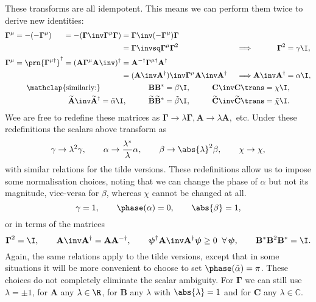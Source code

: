 \documentclass[11pt]{article}
\newcommand{\invd}{^{-\dag}}
\newcommand{\Gammab}{\boldsymbol{\Gamma}}
\newcommand{\Gammap}[1][\mu]{\prn{\Gammab^{#1}}}
\newcommand{\mud}{{\mu\dag}}
\newcommand{\A}{\mathbf{A}}
\newcommand{\B}{\mathbf{B}}
\renewcommand{\C}{\mathbf{C}}
\newcommand{\At}{\widetilde{\mathbf{A}}}
\newcommand{\Bt}{\widetilde{\mathbf{B}}}
\newcommand{\Ct}{\widetilde{\mathbf{C}}}
\newcommand{\Cb}{\mathbb{C}}
\newcommand{\psib}{\boldsymbol{\psi}}
\newcommand{\alphat}{\tilde{\alpha}}
\newcommand{\betat}{\tilde{\beta}}
\newcommand{\chit}{\tilde{\chi}}
\begin{document}
These transforms are all idempotent.
This means we can perform them twice to derive new identities:
%
\begin{equation*}
\begin{gathered}
\begin{alignedat}{5}
  \Gammab^\mu &= -(-\Gammab^\mu) &
        &= -(\Gammab\inv \Gammab^\mu \Gammab) &
        &= \Gammab\inv (-\Gammab^\mu) \Gammab \\ && &&
        &= \Gammab\invsq \Gammab^\mu \Gammab^2 &\quad
  &\implies &
  \Gammab^2 &= \gamma \I, \\
  \Gammab^\mu &= \Gammap[\mud]^\dag &
        &= (\A \Gammab^\mu \A\inv)^\dag &
        &= \A\invd \Gammab^\mud \A^\dag \\ && &&
        &= (\A\inv \A^\dag)\inv \Gammab^\mu \A\inv \A^\dag &
  &\implies &
  \A\inv \A^\dag &= \alpha \I,
\end{alignedat} \\
\begin{aligned}
  \mathclap{\text{similarly:}} &&\qquad
  \B \B^\ast &= \beta \I, &\qquad
  \C\inv \C\trans &= \chi \I, \\
  \At\inv \At^\dag &= \alphat \I, &
  \Bt \Bt^\ast &= \betat \I, &
  \Ct\inv \Ct\trans &= \chit \I.
\end{aligned}
\end{gathered}
\end{equation*}
%
Wee are free to redefine these matrices as $\Gammab \rightarrow \lambda \Gammab, \A \rightarrow \lambda \A,$ etc.
Under these redefinitions the scalars above transform as
%
\begin{equation*}
  \gamma \rightarrow \lambda^2 \gamma, \qquad
  \alpha \rightarrow \frac{\lambda^\ast}{\lambda} \alpha, \qquad
  \beta \rightarrow \abs{\lambda}^2 \beta, \qquad
  \chi \rightarrow \chi,
\end{equation*}
%
with similar relations for the tilde versions.
These redefinitions allow us to impose some normalisation choices, noting that we can change the phase of $\alpha$ but not its magnitude, vice-versa for $\beta$, whereas $\chi$ cannot be changed at all.
%
\begin{equation}\label{eq:normscalar}
  \gamma = 1, \qquad
  \phase(\alpha) = 0, \qquad
  \abs{\beta} = 1,
\end{equation}
%
or in terms of the matrices
%
\begin{equation}\label{eq:normmats}
  \Gammab^2 = \I, \qquad
  \A\inv \A^\dag = \A \A\invd, \qquad
  \psib^\dag \A\inv \A^\dag \psib \geq 0 \;\; \forall \, \psib, \qquad
  \B^\ast \B^2 \B^\ast = \I.
\end{equation}
%
Again, the same relations apply to the tilde versions, except that in some situations it will be more convenient to choose to set \( \phase(\alphat) = \pi \).
These choices do not completely eliminate the scalar ambiguity.
For $\Gammab$ we can still use $\lambda = \pm 1$, for $\A$ any $\lambda \in \R$, for $\B$ any $\lambda$ with $\abs{\lambda} = 1$ and for $\C$ any $\lambda \in \Cb$.
\end{document}
